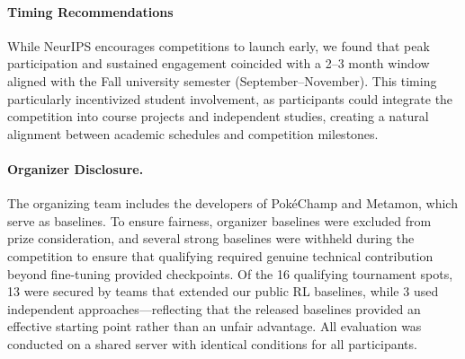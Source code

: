 \paragraph{Timing Recommendations}
While NeurIPS encourages competitions to launch early, we found that peak participation and sustained engagement coincided with a 2--3 month window aligned with the Fall university semester (September--November). This timing particularly incentivized student involvement, as participants could integrate the competition into course projects and independent studies, creating a natural alignment between academic schedules and competition milestones.

\paragraph{Organizer Disclosure.} The organizing team includes the developers of PokéChamp and Metamon, which serve as baselines. To ensure fairness, organizer baselines were excluded from prize consideration, and several strong baselines were withheld during the competition to ensure that qualifying required genuine technical contribution beyond fine-tuning provided checkpoints. Of the 16 qualifying tournament spots, 13 were secured by teams that extended our public RL baselines, while 3 used independent approaches---reflecting that the released baselines provided an effective starting point rather than an unfair advantage. All evaluation was conducted on a shared server with identical conditions for all participants.
